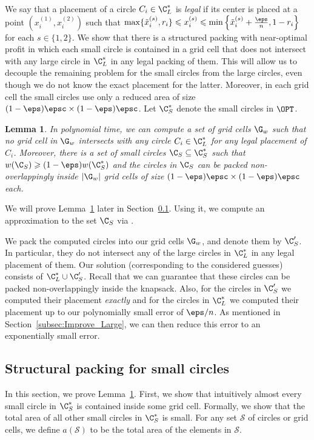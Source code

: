\documentclass[10pt,a4paper]{article}
\newtheorem{lemma}{Lemma}[section]
\theoremstyle{plain}
\theoremstyle{plain}
\theoremstyle{plain}
\theoremstyle{definition}
\newcommand{\ari}[1]{#1}
\newcommand{\agtwo}[1]{#1}
\begin{document}
{We say that a placement of a circle $C_{i}\in\C_{L}^{*}$ is \emph{legal} if its
center is placed at a point $(x_{i}^{(1)},x_{i}^{(2)})$ such that
$\max\{\tilde{x}_{i}^{(s)},r_{i}\}\leqslant x_{i}^{(s)}\leqslant\min\left\{ \tilde{x}_{i}^{(s)}+\frac{\eps}{n},1-r_{i}\right\} $
for each $s\in\{1,2\}$. We show that there is a structured packing with near-optimal profit in which each small circle is contained in a grid cell
that does not intersect with any large circle in $\C_{L}^{*}$ in any legal packing of them. This will allow us to decouple the remaining problem
for the small circles from the large circles, even though we do not know the exact placement for the latter.
Moreover, in each grid cell the small circles use only a reduced area of size $(1-\eps) \epsc \times(1-\eps) \epsc$.
Let $\C_{S}^{*}$ denote the small circles in $\OPT$.

\begin{lemma}\label{lem:structured-packing}
	In polynomial time, we can compute a set of grid cells $\G_w$ such that no grid cell in $\G_w$ intersects with any
	circle $C_i \in\C_{L}^{*}$ for any legal placement of $C_i$. Moreover, there is a set of small circles $\C_S \subseteq \C_{S}^{*}$ such that $w(\C_{S}) \geqslant (1-\eps)w(\C_{S}^{*})$ and
	the circles in $\C_S$ can be packed non-overlappingly inside $|\G_w|$ grid cells of size $(1-\eps) \epsc \times(1-\eps) \epsc$ each.
\end{lemma}
We will prove Lemma~\ref{lem:structured-packing} later in Section~\ref{sec:structured-packing}. Using it, we compute an approximation to the set $\C_S$ via \ari{.}


We pack the computed circles into our grid cells $\G_w$, and denote them by $\C'_S$. In particular, they do not intersect any of the
large circles in $\C_{L}^{*}$ in any legal placement of them. Our solution (corresponding to the considered guesses) consists of $\C_{L}^{*}\cup \C'_S$. Recall that we can guarantee that these circles can be packed non-overlappingly inside the knapsack. Also, for the circles in
$\C'_S$ we computed their placement \emph{exactly} and for the circles in $\C_{L}^{*}$ we computed their placement up to our polynomially small error of $\eps/n$. As mentioned in Section~\ref{subsec:Improve_Large}, we can then reduce this error to an exponentially small error.

\subsection{Structural packing for small circles}\label{sec:structured-packing}
In this section, we prove Lemma~\ref{lem:structured-packing}.
First, we show that intuitively almost \agtwo{every} small circle in $\C_{S}^{*}$ is contained inside some grid cell.
Formally, we show that the total area of all other small circles in $\C_{S}^{*}$ is small.
For any set $\mathcal{S}$ of circles or grid cells, we define $a(\mathcal{S})$ to be the total area of the elements in $\mathcal{S}$.

}
\end{document}
